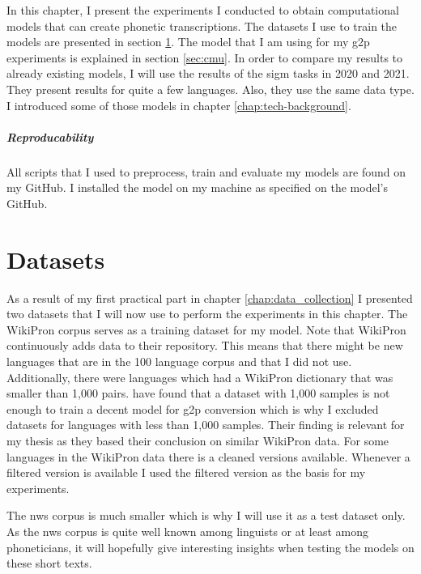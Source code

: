 
\label{chap:exp}
In this chapter, I present the experiments I conducted to obtain computational models that can create phonetic transcriptions. The datasets I use to train the models are presented in section \ref{sec:dataset-models}. The model that I am using for my \ac{g2p} experiments is explained in section \ref{sec:cmu}. In order to compare my results to already existing models, I will use the results of the \ac{sigm} tasks in 2020 and 2021. They present results for quite a few languages. Also, they use the same data type. I introduced some of those models in chapter \ref{chap:tech-background}. 

\subparagraph{Reproducability}
All scripts that I used to preprocess, train and evaluate my models are found on my GitHub. I installed the model on my machine as specified on the model's GitHub. 

\section{Datasets}
\label{sec:dataset-models}
As a result of my first practical part in chapter \ref{chap:data_collection} I presented two datasets that I will now use to perform the experiments in this chapter. The WikiPron corpus serves as a training dataset for my model. Note that WikiPron continuously adds data to their repository. This means that there might be new languages that are in the 100 language corpus and that I did not use. Additionally, there were languages which had a WikiPron dictionary that was smaller than 1,000 pairs. \citet{Ashby-Bartley.2021} have found that a dataset with 1,000 samples is not enough to train a decent model for \ac{g2p} conversion which is why I excluded datasets for languages with less than 1,000 samples. Their finding is relevant for my thesis as they based their conclusion on similar WikiPron data. For some languages in the WikiPron data there is a cleaned versions available. Whenever a filtered version is available I used the filtered version as the basis for my experiments.

The \ac{nws} corpus is much smaller which is why I will use it as a test dataset only. As the \ac{nws} corpus is quite well known among linguists or at least among phoneticians, it will hopefully give interesting insights when testing the models on these short texts. 

